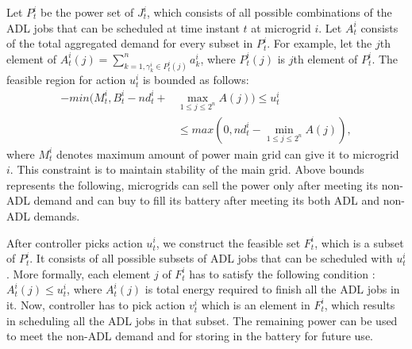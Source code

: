 Let $P_{t}^{i}$ be the power set of $J_{t}^{i}$, which consists of all possible combinations of the ADL jobs that can be scheduled at time instant $t$ at microgrid $i$. Let  $A_{t}^{i}$ consists of the total aggregated demand  for every subset in  $P_{t}^{i}$. For example, let the $j$th element of $A_{t}^{i}(j) = \sum_{k=1, \gamma_k^i \in P_{t}^{i}(j) }^n a_k^i$, where $ P_{t}^{i}(j)$ is $j$th element of  $P_{t}^{i}$.
 The feasible region for action $u_{t}^{i}$ is bounded as follows:
\begin{align}
-min(M_t^i, B_t^i - nd_t^i + &\max_{1\leq j \leq 2^n} A(j) ) \leq u_t^i \nonumber\\ &\leq max(0, nd_t^i - \min_{1\leq j \leq 2^n} A(j)),
\end{align}
where $M_t^i$ denotes maximum amount of power main grid can give it to microgrid $i$. This constraint is to maintain stability of the main grid. Above bounds represents the following, microgrids can sell the power only after meeting its non-ADL demand and can buy to fill its battery after meeting its both ADL and non-ADL demands.

After controller picks action $u_{t}^{i}$, we construct the feasible set $F_{t}^{i}$, which is a subset of $P_{t}^{i}$. It consists of all possible subsets of ADL jobs that can be scheduled with $u_{t}^{i}$. More formally, each element $j$ of  $F_{t}^{i}$ has to satisfy the following condition :   $A_t^i(j) \leq u_{t}^{i} $, where $A_t^i(j)$ is total energy required to finish all the ADL jobs in it. Now, controller has to pick action $v_{t}^{i}$ which is an element in $F_{t}^{i}$, which results in scheduling all the ADL jobs in that subset. The remaining power can be used to meet the non-ADL demand and for storing in the battery for future use.

